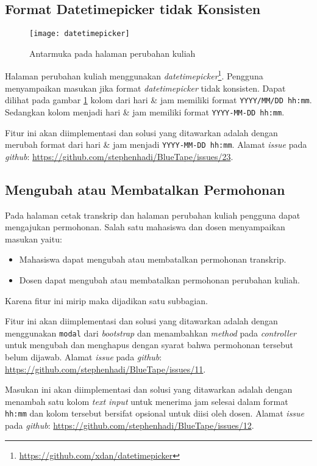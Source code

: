 \subsection{Format Datetimepicker tidak Konsisten}
\label{issue:23}
\begin{figure}[H]
	\centering
	\texttt{[image: datetimepicker]} 
	\caption{Antarmuka pada halaman perubahan kuliah}
	\label{fig:formatdatetimepicker}
\end{figure}

Halaman perubahan kuliah menggunakan \textit{datetimepicker}\footnote{\url{https://github.com/xdan/datetimepicker}}. Pengguna menyampaikan masukan jika format \textit{datetimepicker} tidak konsisten. Dapat dilihat pada gambar \ref{fig:formatdatetimepicker} kolom dari hari \& jam memiliki format \texttt{YYYY/MM/DD hh:mm}. Sedangkan kolom menjadi hari \& jam memiliki format \texttt{YYYY-MM-DD hh:mm}.

Fitur ini akan diimplementasi dan solusi yang ditawarkan adalah dengan merubah format dari hari \& jam menjadi \texttt{YYYY-MM-DD hh:mm}. Alamat \textit{issue} pada \textit{github}: \url{https://github.com/stephenhadi/BlueTape/issues/23}.

\subsection{Mengubah atau Membatalkan Permohonan}
\label{issue:11}
Pada halaman cetak transkrip dan halaman  perubahan kuliah pengguna dapat mengajukan permohonan. Salah satu mahasiswa dan dosen menyampaikan masukan yaitu:
\begin{itemize}
	\item Mahasiswa dapat mengubah atau membatalkan permohonan transkrip. 
	\item Dosen dapat mengubah atau membatalkan permohonan perubahan kuliah.
\end{itemize}
Karena fitur ini mirip maka dijadikan satu subbagian. 

Fitur ini akan diimplementasi dan solusi yang ditawarkan adalah dengan menggunakan \texttt{modal} dari \textit{bootstrap} dan menambahkan \textit{method} pada \textit{controller} untuk mengubah dan menghapus dengan syarat bahwa permohonan tersebut belum dijawab. Alamat \textit{issue} pada \textit{github}: \url{https://github.com/stephenhadi/BlueTape/issues/11}.


Masukan ini akan diimplementasi dan solusi yang ditawarkan adalah dengan menambah satu kolom \textit{text input} untuk menerima jam selesai dalam format \texttt{hh:mm} dan kolom tersebut bersifat opsional untuk diisi oleh dosen. Alamat \textit{issue} pada \textit{github}: \url{https://github.com/stephenhadi/BlueTape/issues/12}.

